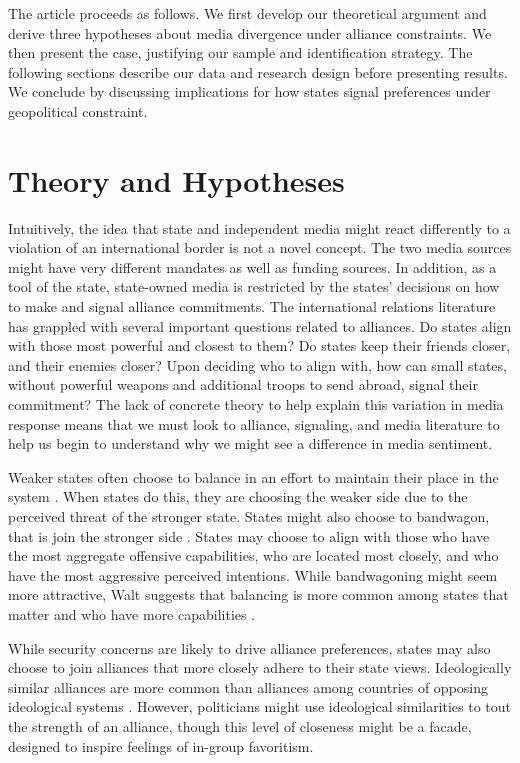 \documentclass[12pt]{article}
\begin{document}
The article proceeds as follows. We first develop our theoretical argument and derive three hypotheses about media divergence under alliance constraints. We then present the case, justifying our sample and identification strategy. The following sections describe our data and research design before presenting results. We conclude by discussing implications for how states signal preferences under geopolitical constraint.


\section*{Theory and Hypotheses}

Intuitively, the idea that state and independent media might react differently to a violation of an international border is not a novel concept. The two media sources might have very different mandates as well as funding sources. In addition, as a tool of the state, state-owned media is restricted by the states' decisions on how to make and signal alliance commitments. The international relations literature has grappled with several important questions related to alliances. Do states align with those most powerful and closest to them? Do states keep their friends closer, and their enemies closer? Upon deciding who to align with, how can small states, without powerful weapons and additional troops to send abroad, signal their commitment? The lack of concrete theory to help explain this variation in media response means that we must look to alliance, signaling, and media literature to help us begin to understand why we might see a difference in media sentiment. 

Weaker states often choose to balance in an effort to maintain their place in the system \citep{waltz_theory_2010}. When states do this, they are choosing the weaker side due to the perceived threat of the stronger state. States might also choose to bandwagon, that is join the stronger side \citep{waltz_theory_2010, walt_origins_2007}. States may choose to align with those who have the most aggregate offensive capabilities, who are located most closely, and who have the most aggressive perceived intentions. While bandwagoning might seem more attractive, Walt suggests that balancing is more common among states that matter and who have more capabilities \citep{walt_origins_2007}. 

While security concerns are likely to drive alliance preferences, states may also choose to join alliances that more closely adhere to their state views. Ideologically similar alliances are more common than alliances among countries of opposing ideological systems \citep{walt_origins_2007}. However, politicians might use ideological similarities to tout the strength of an alliance, though this level of closeness might be a facade, designed to inspire feelings of in-group favoritism. 
\end{document}
